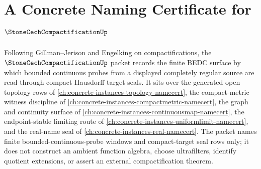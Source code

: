 \chapter{A Concrete Naming Certificate for $\StoneCechCompactificationUp$}
\label{ch:concrete-instances-stone-cech-compactification-namecert}

Following Gillman--Jerison and Engelking on compactifications, the $\StoneCechCompactificationUp$ packet records the finite BEDC surface by which bounded continuous probes from a displayed completely regular source are read through compact Hausdorff target seals. It sits over the generated-open topology rows of \autoref{ch:concrete-instances-topology-namecert}, the compact-metric witness discipline of \autoref{ch:concrete-instances-compactmetric-namecert}, the graph and continuity surface of \autoref{ch:concrete-instances-continuousmap-namecert}, the endpoint-stable limiting route of \autoref{ch:concrete-instances-uniformlimit-namecert}, and the real-name seal of \autoref{ch:concrete-instances-real-namecert}. The packet names finite bounded-continuous-probe windows and compact-target seal rows only; it does not construct an ambient function algebra, choose ultrafilters, identify quotient extensions, or assert an external compactification theorem.


